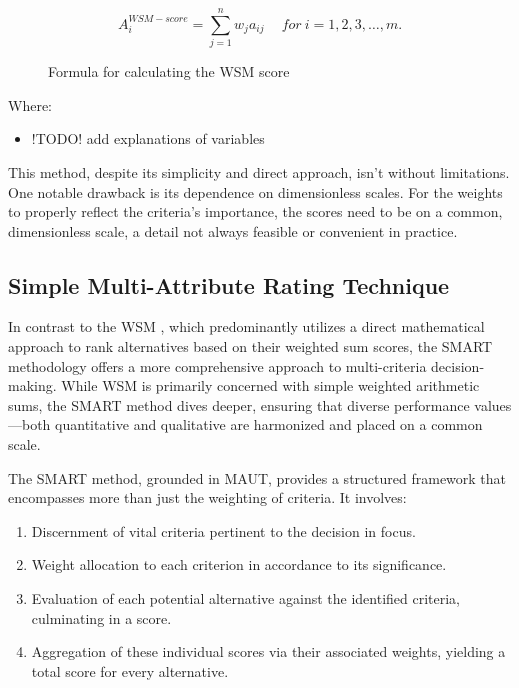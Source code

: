 \begin{figure}[h]
    \centering
    \Large
    \[ A_{i}^{WSM-score} = \sum_{j=1}^{n} w_{j} a_{ij} \quad \ for \ i = 1, 2, 3, \dots, m. \]
    \caption{Formula for calculating the \ac*{WSM} score\protect\footnotemark} 
\end{figure}

Where:
\begin{itemize}
    \item !TODO! add explanations of variables
\end{itemize}

This method, despite its simplicity and direct approach, isn't without limitations.
One notable drawback is its dependence on dimensionless scales.
For the weights to properly reflect the criteria's importance, the scores need to be on a common, dimensionless scale, a detail not always feasible or convenient in practice.

\subsection{Simple Multi-Attribute Rating Technique}

In contrast to the \ac{WSM} , which predominantly utilizes a
direct mathematical approach to rank alternatives based on their weighted sum
scores, the \ac{SMART} methodology offers a more comprehensive approach to
multi-criteria decision-making. While \ac{WSM} is primarily concerned with simple
weighted arithmetic sums, the \ac{SMART} method dives deeper, ensuring that diverse
performance values—both quantitative and qualitative are harmonized and placed
on a common scale.

The \ac{SMART} method, grounded in \ac{MAUT}, provides a
structured framework that encompasses more than just the weighting of criteria.
It involves:

\begin{enumerate} \item Discernment of vital criteria pertinent to the decision
in focus. \item Weight allocation to each criterion in accordance to its
significance. \item Evaluation of each potential alternative against the
identified criteria, culminating in a score. \item Aggregation of these
individual scores via their associated weights, yielding a total score for every
alternative. \end{enumerate}


